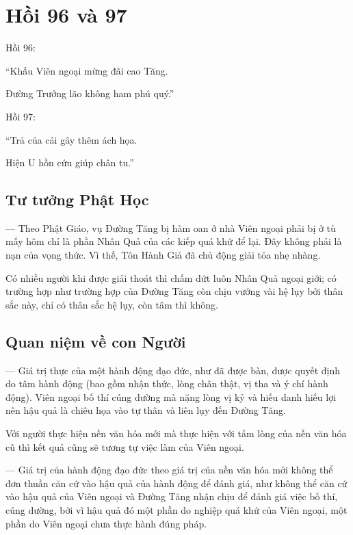 \chapter{Hồi 96 và 97} %
\label{cha:hoi_96_97}

Hồi 96:

\begin{itshape}
``Khấu Viên ngoại mừng đãi cao Tăng.

Đường Trưởng lão không ham phú quý.''
\end{itshape}

Hồi 97:

\begin{itshape}
``Trả của cải gây thêm ách họa.

Hiện U hồn cứu giúp chân tu.''
\end{itshape}

\section{Tư tưởng Phật Học} %
\label{sec:96_97_phat_hoc}

— Theo Phật Giáo, vụ Đường Tăng bị hàm oan ở nhà Viên ngoại phải bị ở tù mấy hôm chỉ là phần Nhân Quả của các kiếp quá khứ để lại. Đây không phải là nạn của vọng thức. Vì thế, Tôn Hành Giả đã chủ động giải tỏa nhẹ nhàng.

Có nhiều người khi được giải thoát thì chấm dứt luôn Nhân Quả ngoại giới; có trường hợp như trường hợp của Đường Tăng còn chịu vướng vài hệ lụy bởi thân sắc này, chỉ có thân sắc hệ lụy, còn tâm thì không.

\section{Quan niệm về con Người} %
\label{sec:96_97_con_nguoi}

— Giá trị thực của một hành động đạo đức, như đã được bàn, được quyết định do tâm hành động (bao gồm nhận thức, lòng chân thật, vị tha và ý chí hành động). Viên ngoại bố thí cúng dường mà nặng lòng vị kỷ và hiếu danh hiếu lợi nên hậu quả là chiêu họa vào tự thân và liên lụy đến Đường Tăng.

Với người thực hiện nền văn hóa mới mà thực hiện với tấm lòng của nền văn hóa cũ thì kết quả cũng sẽ tương tự việc làm của Viên ngoại.

— Giá trị của hành động đạo đức theo giá trị của nền văn hóa mới không thể đơn thuần căn cứ vào hậu quả của hành động để đánh giá, như không thể căn cứ vào hậu quả của Viên ngoại và Đường Tăng nhận chịu để đánh giá việc bố thí, cúng dường, bởi vì hậu quả đó một phần do nghiệp quá khứ của Viên ngoại, một phần do Viên ngoại chưa thực hành đúng pháp.

